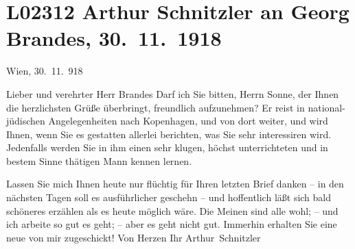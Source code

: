 

\section[Arthur Schnitzler an Georg Brandes, 30. 11. 1918]{L02312 Arthur Schnitzler an Georg Brandes, 30. 11. 1918}
\nopagebreak{}
\rehead{ }\normalsize\beginnumbering{}
\toendnotes[C]{\smallbreak\pagebreak[2]}
\toendnotes[C]{\smallbreak}
\pstart
           \raggedleft{}{\pb}Wien, 30. 11. 918\pend
           
\pstart{}Lieber und verehrter Herr Brandes\pend\vspace{0.5em}
\pstart
           Darf ich Sie bitten, Herrn Sonne, der Ihnen die
               herzlichsten Grüße überbringt, freundlich aufzunehmen? Er reist in national-jüdischen
               Angelegenheiten nach Kopenhagen, und von dort
               weiter, und wird Ihnen, wenn Sie es gestatten allerlei berichten, was Sie sehr
               interessiren wird. Jedenfalls werden Sie in ihm einen sehr klugen, höchst
               unterrichteten und in bestem Sinne thätigen Mann kennen lernen.\pend
           
\pstart
           Lassen Sie mich Ihnen heute nur flüchtig für Ihren letzten Brief danken – in den
               nächsten Tagen soll es ausführlicher geschehn – und hoffentlich läßt sich bald
               schöneres erzählen als es heute möglich wäre. Die Meinen sind alle wohl; – und ich
               arbeite so gut es geht; – aber es geht nicht gut. Immerhin erhalten Sie eine neue
                  \label{T_L02312-1v}\label{T_L02312-1} von
               mir zugeschickt! Von Herzen\pend
           \pstart Ihr \spacefill\mbox{Arthur Schnitzler}\pend{}\endnumbering{}  
      